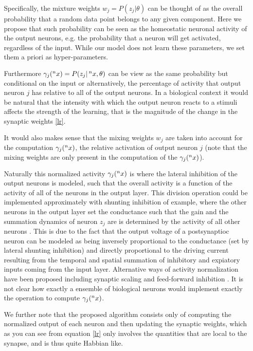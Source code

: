 \documentclass{article}
\begin{document}
Specifically, the mixture weights \(w_j = P(z_j | \theta)\) can be
thought of as the overall probability that a random data point belongs
to any given component. Here we propose that such probability can be
seen as the homeostatic neuronal activity of the output neurons,
e.g. the probability that a neuron will get activated, regardless of the
input. While our model does not learn these parameters, we set them
a priori as hyper-parameters.

Furthermore \(\gamma_j(\prescript{n}{}{x}) = P (z_j | \prescript{n}{}{x}, \theta)\) can be view as the
same probability but conditional on the input or alternatively, the
percentage of activity that output neuron \(j\) has relative to all of
the output neurons. In a biological context it would be natural that the
intensity with which the output neuron reacts to a stimuli affects the
strength of the learning, that is the magnitude of the change in the
synaptic weights \eqref{lr}. 

It would also makes sense
that the mixing weights \(w_j\) are taken into account for the
computation \(\gamma_j(\prescript{n}{}{x})\), the relative activation of output neuron
\(j\) (note that the mixing weights are only present in the computation
of the \(\gamma_j(\prescript{n}{}{x})\)).

Naturally this normalized activity \(\gamma_j(\prescript{n}{}{x})\) is where the
lateral inhibition of the output neurons is modeled, such that the overall
activity is a function of the activity of all of the neurons in the
output layer. This division operation could be implemented approximately
with shunting inhibition of example, where the other neurons in the
output layer set the conductance such that the gain and the summation
dynamics of neuron \(z_j\) are is determined by the activity of all
other neurons \cite{carandini1994}. This is due to the fact
that the output voltage of a postsynaptioc neuron can be modeled as
being inversely proportional to the conductance (set by lateral shunting
inhibition) and directly proportional to the driving current resulting
from the temporal and spatial summation of inhibitory and expiatory
inputs coming from the input layer. Alternative ways of activity
normalization have been proposed including synaptic scaling and
feed-forward inhibition \cite{carandini2012} \cite{pouille2009}. It is not
clear how exactly a ensemble of biological neurons would implement exactly the
operation to compute \(\gamma_j(\prescript{n}{}{x})\).

We further note that the proposed algorithm consists only of computing
the normalized output of each neuron and then updating the synaptic
weights, which as you can see from equation \eqref{lr}
only involves the quantities that are local to the synapse, and is thus quite
Habbian like. 
\end{document}
